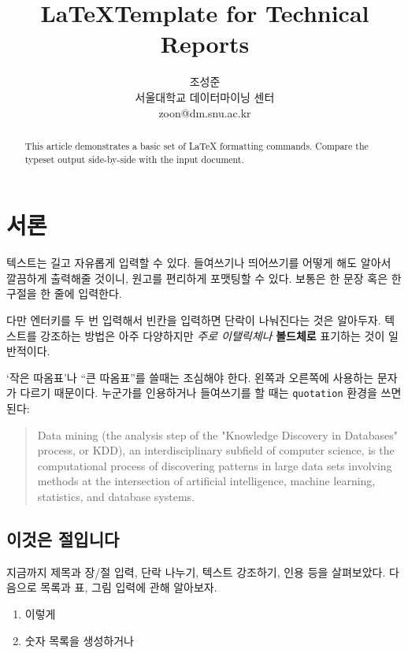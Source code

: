 \documentclass[11pt]{article}           %
\begin{document}
\title{\LaTeX Template for Technical Reports}
\author{조성준\\
    서울대학교 데이터마이닝 센터\\
    zoon@dm.snu.ac.kr
}
\maketitle

\begin{abstract}
This article demonstrates a basic set of LaTeX formatting commands.
Compare the typeset output side-by-side with the input document.
\end{abstract}

\section{서론}
텍스트는 길고 자유롭게 입력할 수 있다.
    들여쓰기나 띄어쓰기를 어떻게 해도
   알아서 깔끔하게 출력해줄 것이니, 원고를 편리하게 포맷팅할 수 있다.
보통은 한 문장 혹은 한 구절을 한 줄에 입력한다.

다만 엔터키를 두 번 입력해서 빈칸을 입력하면 단락이 나눠진다는 것은 알아두자.
텍스트를 강조하는 방법은 아주 다양하지만 \textit{주로 이탤릭체나} \textbf{볼드체로} 표기하는 것이 일반적이다.

`작은 따옴표'나 ``큰 따옴표''를 쓸때는 조심해야 한다.
왼쪽과 오른쪽에 사용하는 문자가 다르기 때문이다.
누군가를 인용하거나 들여쓰기를 할 때는 \verb+quotation+ 환경을 쓰면 된다:

\begin{quotation}
Data mining (the analysis step of the "Knowledge Discovery in Databases" process, or KDD), an interdisciplinary subfield of computer science, is the computational process of discovering patterns in large data sets involving methods at the intersection of artificial intelligence, machine learning, statistics, and database systems.~\cite{mucha2010community}
\end{quotation}

\subsection{이것은 절입니다}

지금까지 제목과 장/절 입력, 단락 나누기, 텍스트 강조하기, 인용 등을 살펴보았다.
다음으로 목록과 표, 그림 입력에 관해 알아보자.

\begin{enumerate}
    \item 이렇게
    \item 숫자 목록을 생성하거나
\end{enumerate}
\end{document}
